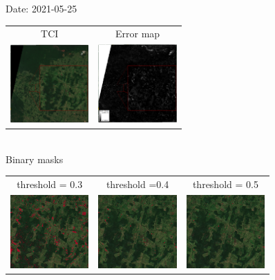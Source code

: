 \documentclass{beamer}
\begin{document}
\begin{frame}{Date: 2021-05-25}
    \centering
        \begin{tabular}{cc}
        TCI & Error map\\
        \includegraphics[width=3cm]{Figures/v3/20210525/TCI/TCI_zoom2.pdf}
        &
        \includegraphics[width=3cm]{Figures/v3/20210525/error/error_zoom2.pdf}
    \end{tabular}
    \\
    \centering
     Binary masks
        \begin{tabular}{ccc}
            threshold = 0.3  & threshold =0.4 &  threshold = 0.5 \\
        \includegraphics[width=3cm]{Figures/v3/20210525/umbral_03/zoom2.png}
        &
        \includegraphics[width=3cm]{Figures/v3/20210525/umbral_04/zoom2.png}
        &
        \includegraphics[width=3cm]{Figures/v3/20210525/umbral_05/zoom2.png}
        \end{tabular}
    \end{frame}
\end{document}
